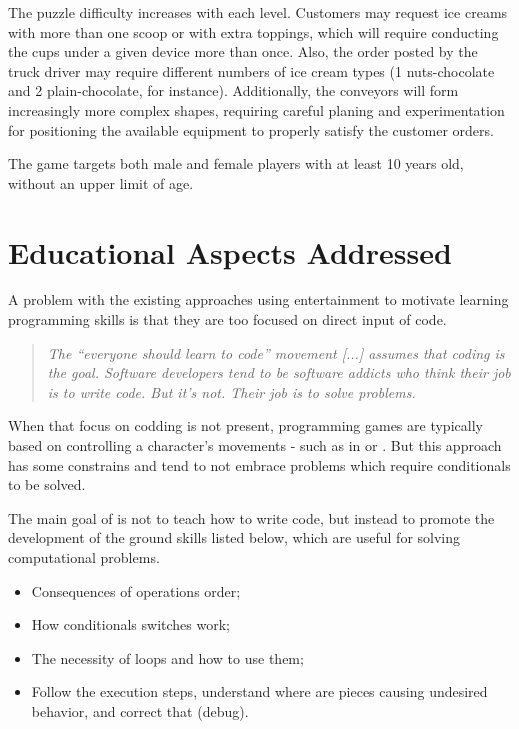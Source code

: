 \documentclass{sigchi}
\begin{document}
    The puzzle difficulty increases with each level. Customers may request ice
    creams with more than one scoop or with extra toppings, which will require
    conducting the cups under a given device more than once. Also, the order
    posted by the truck driver may require different numbers of ice cream types
    (1 nuts-chocolate and 2 plain-chocolate, for instance). Additionally, the
    conveyors will form increasingly more complex shapes, requiring careful
    planing and experimentation for positioning the available equipment to
    properly satisfy the customer orders.

    The game targets both male and female players with at least 10 years old,
    without an upper limit of age.

\section{Educational Aspects Addressed}
    A problem with the existing approaches using entertainment to motivate
    learning programming skills is that they are too focused on direct input of
    code.
    \begin{quotation}
        \noindent
        \textit{The ``everyone should learn to code'' movement [...] assumes
                that coding is the goal. Software developers tend to be software
                addicts who think their job is to write code. But it's not.
                Their job is to solve problems.} \cite{Atwood2012}
    \end{quotation}

    When that focus on codding is not present, programming games are typically
    based on controlling a character's movements - such as in \doctorgame or
    \lightbot. But this approach has some constrains and tend to not embrace
    problems which require conditionals to be solved.

    The main goal of \gamename is not to teach how to write code, but instead to
    promote the development of the ground skills listed below, which are useful
    for solving computational problems.
    \begin{itemize}[noitemsep,topsep=0pt,parsep=0.75em]
        \item Consequences of operations order;
        \item How conditionals switches work;
        \item The necessity of loops and how to use them;
        \item Follow the execution steps, understand where are pieces
              causing undesired behavior, and correct that (debug).
    \end{itemize}
\end{document}

